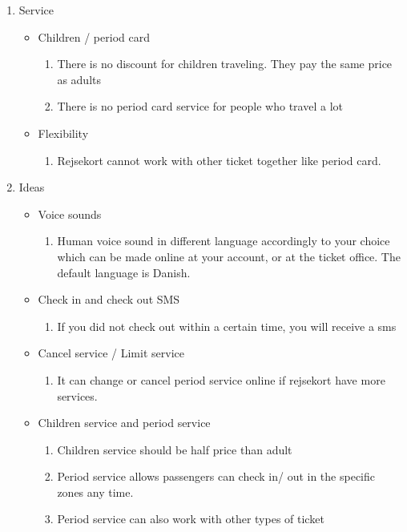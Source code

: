 \begin{enumerate}
\begin{itemize}
		\end{itemize}
	
	
	\item Service
		\begin{itemize}
		
			\item Children / period card
				\begin{enumerate}
					\item There is no discount for children traveling. They pay the same price as adults
					\item There is no period card service for people who travel a lot
				\end{enumerate}

			\item Flexibility
				\begin{enumerate}
					\item Rejsekort cannot work with other ticket together like period card.
				\end{enumerate}
		\end{itemize}
		
	\item Ideas
		\begin{itemize}
			
			\item Voice sounds
				\begin{enumerate}
					\item Human voice sound in different language accordingly to your choice which can be made online at your account, or at the ticket office. The default language is Danish.
				\end{enumerate}
			
			\item Check in and check out SMS
				\begin{enumerate}
					\item If you did not check out within a certain time, you will receive a sms
				\end{enumerate}
			
			\item Cancel service / Limit service
				\begin{enumerate}
					\item It can change or cancel period service online if rejsekort have more services.
				\end{enumerate}
			
			\item Children service and period service
				\begin{enumerate}
					\item Children service should be half price than adult
					\item Period service allows passengers can check in/ out in the specific zones any time.
					\item Period service can also work with other types of  ticket 
				\end{enumerate}
				

\end{itemize}
\end{enumerate}
